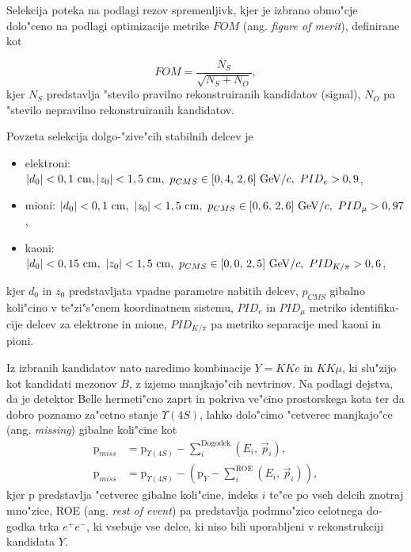 \begin{otherlanguage}{slovene}
Selekcija poteka na podlagi rezov spremenljivk, kjer je izbrano obmo"cje dolo"ceno na podlagi optimizacije metrike $FOM$ (ang. \textit{figure of merit}), definirane kot 

\begin{equation}
FOM = \frac{N_S}{\sqrt{N_S + N_O}},
\end{equation}
kjer $N_S$ predstavlja "stevilo pravilno rekonstruiranih kandidatov (signal), $N_O$ pa "stevilo nepravilno rekonstruiranih kandidatov.

Povzeta selekcija dolgo-"zive"cih stabilnih delcev je
\begin{itemize}
\item elektroni: $\vert d_0 \vert < 0,1\mathrm{~cm}, \vert z_0 \vert < 1,5\mathrm{~cm},~p_{CMS} \in [0,4,\,2,6]\mathrm{~GeV}/c,~PID_e > 0,9$,
\item mioni: $\vert d_0 \vert < 0,1\mathrm{~cm},~\vert z_0 \vert < 1,5\mathrm{~cm},~p_{CMS} \in [0,6,\,2,6]\mathrm{~GeV}/c,~PID_\mu > 0,97$,
\item kaoni: $\vert d_0 \vert < 0,15\mathrm{~cm},~\vert z_0 \vert < 1,5\mathrm{~cm},~p_{CMS} \in [0,0,\,2,5]\mathrm{~GeV}/c,~PID_{K/\pi} > 0,6$,
\end{itemize}
kjer $d_0$ in $z_0$ predstavljata vpadne parametre nabitih delcev, $p_{CMS}$ gibalno koli"cino v te"zi"s"cnem koordinatnem sistemu, $PID_e$ in $PID_\mu$ metriko identifikacije delcev za elektrone in mione, $PID_{K/\pi}$ pa metriko separacije med kaoni in pioni.

Iz izbranih kandidatov nato naredimo kombinacije $Y = KKe$ in $KK\mu$, ki slu"zijo kot kandidati mezonov $B$, z izjemo manjkajo"cih nevtrinov. Na podlagi dejstva, da je detektor Belle hermeti"cno zaprt in pokriva ve"cino prostorskega kota ter da dobro poznamo za"cetno stanje $\Upsilon(4S)$, lahko dolo"cimo "cetverec manjkajo"ce (ang. \textit{missing}) gibalne koli"cine kot
\begin{align}
\mathrm{p}_{miss} &= \mathrm{p}_{\Upsilon(4S)} - \sum_i^{\mathrm{Dogodek}}\left(E_i,\,\vec{p}_i \right),\\
\label{eq:ROEloop_si}
\mathrm{p}_{miss} &= \mathrm{p}_{\Upsilon(4S)} - \left(\mathrm{p}_{Y} -\sum_i^{\mathrm{ROE}}\left(E_i,\,\vec{p}_i \right)\right),
\end{align}
kjer $\mathrm{p}$ predstavlja "cetverec gibalne koli"cine, indeks $i$ te"ce po vseh delcih znotraj mno"zice, ROE (ang. \textit{rest of event}) pa predstavlja podmno"zico celotnega dogodka trka $e^+e^-$, ki vsebuje vse delce, ki niso bili uporabljeni v rekonstrukciji kandidata $Y$.


\end{otherlanguage}
